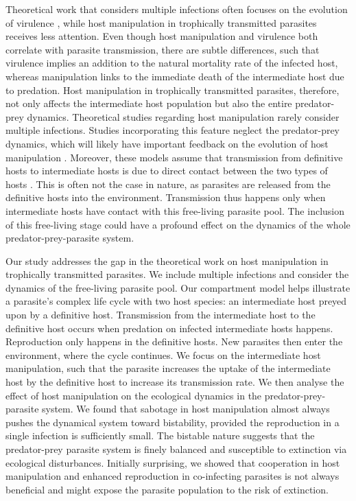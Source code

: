 \documentclass[a4paper]{scrartcl}
\begin{document}
Theoretical work that considers multiple infections often focuses on the evolution of virulence \citep{vanBaalen1995, Alizon2013, Alizon2008, Choisy2010, Alizon2012}, while host manipulation in trophically transmitted parasites receives less attention. 
Even though host manipulation and virulence both correlate with parasite transmission, there are subtle differences, such that virulence implies an addition to the natural mortality rate of the infected host, whereas manipulation links to the immediate death of the intermediate host due to predation. 
Host manipulation in trophically transmitted parasites, therefore, not only affects the intermediate host population but also the entire predator-prey dynamics. 
Theoretical studies regarding host manipulation rarely consider multiple infections. 
Studies incorporating this feature neglect the predator-prey dynamics, which will likely have important feedback on the evolution of host manipulation \citep{Parker2003,Vickery2009}.
Moreover, these models assume that transmission from definitive hosts to intermediate hosts is due to direct contact between the two types of hosts \citep{Rogawa2018, Hadeler1989, Fenton2006}. 
This is often not the case in nature, as parasites are released from the definitive hosts into the environment. 
Transmission thus happens only when intermediate hosts have contact with this free-living parasite pool. The inclusion of this free-living stage could have a profound effect on the dynamics of the whole predator-prey-parasite system.


Our study addresses the gap in the theoretical work on host manipulation in trophically transmitted parasites.
We include multiple infections and consider the dynamics of the free-living parasite pool. 
Our compartment model helps illustrate a parasite's complex life cycle with two host species: an intermediate host preyed upon by a definitive host. 
Transmission from the intermediate host to the definitive host occurs when predation on infected intermediate hosts happens. 
Reproduction only happens in the definitive hosts. 
New parasites then enter the environment, where the cycle continues. 
We focus on the intermediate host manipulation, such that the parasite increases the uptake of the intermediate host by the definitive host to increase its transmission rate. 
We then analyse the effect of host manipulation on the ecological dynamics in the predator-prey-parasite system. 
We found that sabotage in host manipulation almost always pushes the dynamical system toward bistability, provided the reproduction in a single infection is sufficiently small. 
The bistable nature suggests that the predator-prey parasite system is finely balanced and susceptible to extinction via ecological disturbances. 
Initially surprising, we showed that cooperation in host manipulation and enhanced reproduction in co-infecting parasites is not always beneficial and might expose the parasite population to the risk of extinction.
\end{document}
